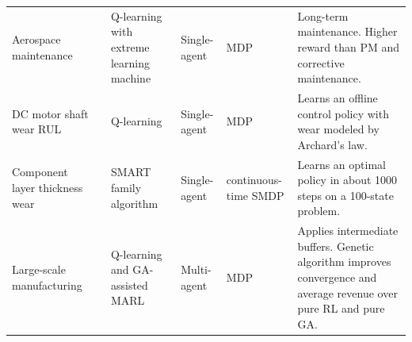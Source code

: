 \documentclass[12pt,oneside]{book}
\begin{document}
\begin{landscape}
\begin{table}[p]
\begin{minipage}{\textwidth}
\begin{tabular}{@{}L{3.5cm}L{2.5cm}L{3.5cm}L{1.5cm}L{1.5cm}L{9.5cm}@{}}
				Aerospace maintenance & \cite{Hu2021} & Q-learning with extreme learning machine & Single-agent & MDP & Long-term maintenance. Higher reward than PM and corrective maintenance.\\
				DC motor shaft wear RUL & \cite{Jha2019171} & Q-learning & Single-agent & MDP & Learns an offline control policy with wear modeled by Archard's law.\\
				Component layer thickness wear & \cite{Adsule2020182} & SMART family algorithm & Single-agent & continuous-time SMDP & Learns an optimal policy in about 1000 steps on a 100-state problem.\\
				Large-scale manufacturing & \cite{Li2020GA} & Q-learning and GA-assisted MARL & Multi-agent & MDP & Applies intermediate buffers. Genetic algorithm improves convergence and average revenue over pure RL and pure GA.\\				
				\bottomrule
			\end{tabular}
		\end{minipage}
	\end{table}
\end{landscape}
\restoregeometry
\end{document}
